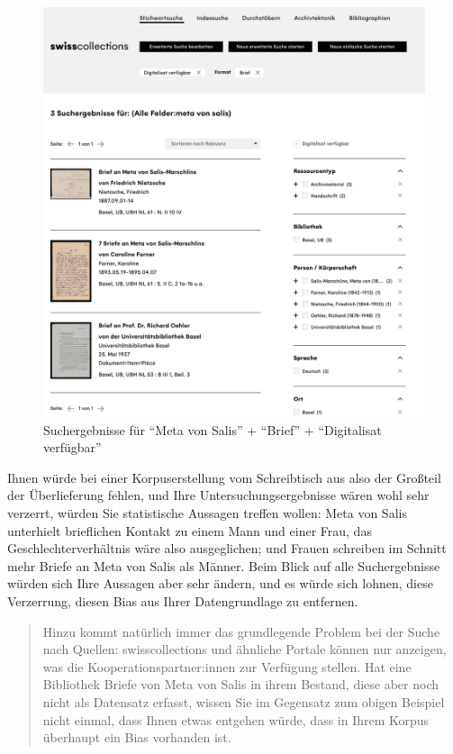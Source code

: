 \documentclass[
  letterpaper,
]{book}
\begin{document}
\begin{figure}

{\centering \includegraphics{./images/suchergebnisse_2.png}

}

\caption{Suchergebnisse für ``Meta von Salis'' + ``Brief'' +
``Digitalisat verfügbar''}

\end{figure}

Ihnen würde bei einer Korpuserstellung vom Schreibtisch aus also der
Großteil der Überlieferung fehlen, und Ihre Untersuchungsergebnisse
wären wohl sehr verzerrt, würden Sie statistische Aussagen treffen
wollen: Meta von Salis unterhielt brieflichen Kontakt zu einem Mann und
einer Frau, das Geschlechterverhältnis wäre also ausgeglichen; und
Frauen schreiben im Schnitt mehr Briefe an Meta von Salis als Männer.
Beim Blick auf alle Suchergebnisse würden sich Ihre Aussagen aber sehr
ändern, und es würde sich lohnen, diese Verzerrung, diesen Bias aus
Ihrer Datengrundlage zu entfernen.

\begin{quote}
Hinzu kommt natürlich immer das grundlegende Problem bei der Suche nach
Quellen: swisscollections und ähnliche Portale können nur anzeigen, was
die Kooperationspartner:innen zur Verfügung stellen. Hat eine Bibliothek
Briefe von Meta von Salis in ihrem Bestand, diese aber noch nicht als
Datensatz erfasst, wissen Sie im Gegensatz zum obigen Beispiel nicht
einmal, dass Ihnen etwas entgehen würde, dass in Ihrem Korpus überhaupt
ein Bias vorhanden ist.
\end{quote}
\end{document}
